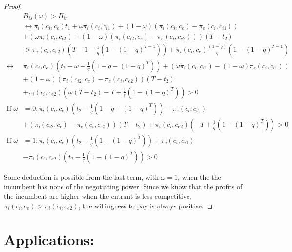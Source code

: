 \begin{proof}
\begin{align*}
&B_{is}(\omega)>\Pi_{ir}
\\
& \leftrightarrow \pi_i(c_i,c_{e})t_1 
+\omega \pi_i(c_i,c_{i1})+(1-\omega)(\pi_i(c_i,c_{e})-\pi_e(c_i,c_{i1}))
\\&+(\omega \pi_i(c_i,c_{e2})+(1-\omega)(\pi_i(c_{i2},c_e)-\pi_e(c_{i},c_{e2})))(T-t_2)  \\
&> \pi_{i}(c_i,c_{e2}) \left( T-1 - \frac{1}{q} \left( 1-(1-q)^{T-1} \right) \right)
+\pi_i(c_i,c_e) \frac{(1-q)}{q} \left( 1-(1-q)^{T-1} \right) \\
\leftrightarrow &\pi_i(c_i,c_e)(t_2 -\omega-\frac{1}{q} \left( 1-q-(1-q)^{T} \right)) 
+(\omega \pi_i(c_i,c_{i1})-(1-\omega)\pi_e(c_i,c_{i1})) \\
& +(1-\omega)(\pi_i(c_{i2},c_e)-\pi_e(c_{i},c_{e2}))(T-t_2) \\
&+ \pi_i(c_{i},c_{e2})\left(\omega(T-t_2)-T+\frac{1}{q} \left( 1-(1-q)^{T} \right)\right)
> 0 \\
\text{If }\omega &=0: \pi_i(c_i,c_e)(t_2 -\frac{1}{q} \left( 1-q-(1-q)^{T} \right)) 
-\pi_e(c_i,c_{i1})  \\
&+(\pi_i(c_{i2},c_e)-\pi_e(c_{i},c_{e2}))(T-t_2)+ \pi_i(c_{i},c_{e2})\left(-T+\frac{1}{q} \left( 1-(1-q)^{T} \right)\right)
> 0
 \\
\text{If }\omega &=1: \pi_i(c_i,c_e)(t_2 -\frac{1}{q} \left( 1-(1-q)^{T} \right)) 
+\pi_i(c_i,c_{i1})\\
&- \pi_i(c_{i},c_{e2})\left(t_2 - \frac{1}{q} \left( 1-(1-q)^{T} \right)\right)
> 0
\end{align*}

Some deduction is possible from the last term, with $\omega = 1$, when the the incumbent has none of the negotiating power. Since we know that the profits of the incumbent are higher when the entrant is less competitive, $\pi_i(c_i,c_e)>\pi_i(c_{i},c_{e2})$, the willingness to pay is always positive. 
\end{proof}

\section{Applications:}\label{application}

